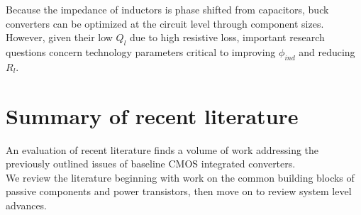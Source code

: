 \documentclass[letterpaper,twocolumn,10pt]{article}
\begin{document}
\indent Because the impedance of inductors is phase shifted from capacitors, buck converters can be optimized at the circuit level through component sizes. However, given their low $Q_l$ due to high resistive loss, important research questions concern technology parameters critical to improving $\phi_{ind}$ and reducing $R_l$.\\    



\section{Summary of recent literature} \label{litReview}
An evaluation of recent literature finds a volume of work addressing the previously outlined issues of baseline CMOS integrated converters.\\
We review the literature beginning with work on the common building blocks of passive components and power transistors, then move on to review system level advances.\\ 
\end{document}
